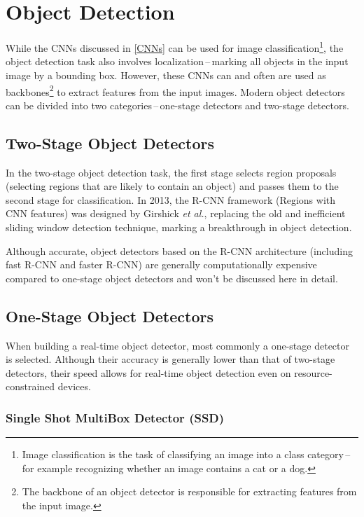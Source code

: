 \section{Object Detection}

While the CNNs discussed in \autoref{CNNs} can be used for image
classification\footnote{Image classification is the task of classifying an image
into a class category\,--\,for example recognizing whether an image contains a
cat or a dog.}, the object detection task also involves
localization\,--\,marking all objects in the input image by a bounding box.
However, these CNNs can and often are used as backbones\footnote{The backbone of an object detector is responsible for extracting
features from the input image.} to extract features from
the input images. Modern object detectors can be divided into two
categories\,--\,one-stage detectors and two-stage detectors.


\subsection{Two-Stage Object Detectors}

In the two-stage object detection task, the first stage selects region proposals
(selecting regions that are likely to contain an object) and passes them to the
second stage for classification. In 2013, the R-CNN framework
\cite{Girshick2013} (Regions with CNN features) was designed by Girshick
\textit{et al.}, replacing the old and inefficient sliding window detection
technique, marking a breakthrough in object detection. \cite{Li2022}

Although accurate, object detectors based on the R-CNN architecture (including
fast R-CNN and faster R-CNN) are generally computationally expensive compared to
one-stage object detectors and won't be discussed here in detail.


\subsection{One-Stage Object Detectors}

When building a real-time object detector, most commonly a one-stage detector is
selected. Although their accuracy is generally lower than that of two-stage
detectors, their speed allows for real-time object detection even on
resource-constrained devices.

\subsubsection{Single Shot MultiBox Detector (SSD)}

